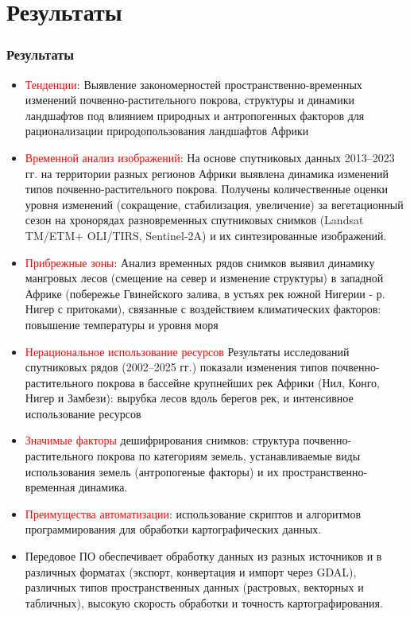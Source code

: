 \documentclass[pdflatex,compress,8pt,
	xcolor={dvipsnames,dvipsnames,svgnames,x11names,table},
	hyperref={colorlinks = true, breaklinks = true, urlcolor = NavyBlue, linkcolor=white, breaklinks = true}]{beamer}
\begin{document}
\section{Результаты}
\begin{frame}\frametitle{Результаты}

\begin{itemize}\small
	\item \textcolor{red}{Тенденции}: Выявление закономерностей пространственно-временных изменений почвенно-растительного покрова, структуры и динамики ландшафтов под влиянием природных и антропогенных факторов для рационализации природопользования ландшафтов Африки
	\item \textcolor{red}{Временной анализ изображений}: На основе спутниковых данных 2013–2023 гг. на территории разных регионов Африки выявлена динамика изменений типов почвенно-растительного покрова. Получены количественные оценки уровня изменений (сокращение, стабилизация, увеличение) за вегетационный сезон на хронорядах разновременных спутниковых снимков (Landsat TM/ETM+ OLI/TIRS, Sentinel-2A) и их синтезированные изображений.
	\item \textcolor{red}{Прибрежные зоны}: Анализ временных рядов снимков выявил динамику мангровых лесов (смещение на север и изменение структуры) в западной Африке (побережье Гвинейского залива, в устьях рек южной Нигерии - р. Нигер с притоками), связанные с воздействием климатических факторов: повышение температуры и уровня моря
	\item \textcolor{red}{Нерациональное использование ресурсов} Результаты исследований спутниковых рядов (2002–2025 гг.) показали изменения типов почвенно-растительного покрова в бассейне крупнейших рек Африки (Нил, Конго, Нигер и Замбези): вырубка лесов вдоль берегов рек, и интенсивное использование ресурсов	
	\item \textcolor{red}{Значимые факторы} дешифрирования снимков: структура почвенно-растительного покрова по категориям земель, устанавливаемые виды использования земель (антропогеные факторы) и их пространственно-временная динамика. 
	\item \textcolor{red}{Преимущества автоматизации}: использование скриптов и алгоритмов программирования для обработки картографических данных.
	\item Передовое ПО обеспечивает обработку данных из разных источников и в различных форматах (экспорт, конвертация и импорт через GDAL), различных типов пространственных данных (растровых, векторных и табличных), высокую скорость обработки и точность картографирования.
\end{itemize}
\end{frame}
\end{document}

